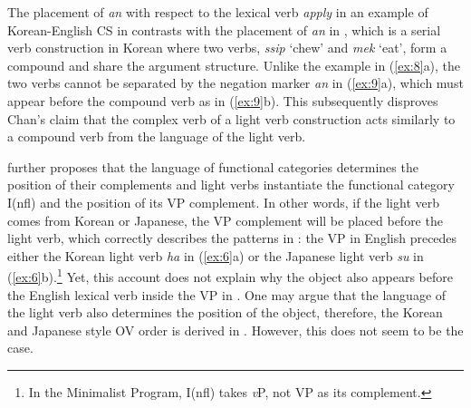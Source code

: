 The placement of \textit{an} with respect to the lexical verb \textit{apply} in an example of Korean-English \ac{CS} in  contrasts with the placement of \textit{an} in , which is a serial verb construction in Korean where two verbs, \textit{ssip} ‘chew’ and \textit{mek} ‘eat’, form a compound and share the argument structure. Unlike the example in (\ref{ex:8}a), the two verbs cannot be separated by the negation marker \textit{an} in (\ref{ex:9}a), which must appear before the compound verb as in (\ref{ex:9}b). This subsequently disproves Chan's claim that the complex verb of a light verb construction acts similarly to a compound verb from the language of the light verb. 

\begin{exe}\ex \label{ex:9}
    \begin{xlist}
    \end{xlist}
\end{exe}

\citet{Chan2008} further proposes that the language of functional categories determines the position of their complements and light verbs instantiate the functional category \acs{I(nfl)} and the position of its \ac{VP} complement. In other words, if the light verb comes from Korean or Japanese, the \ac{VP} complement will be placed before the light verb, which correctly describes the patterns in : the \ac{VP} in English precedes either the Korean light verb \textit{ha} in (\ref{ex:6}a) or the Japanese light verb \textit{su} in (\ref{ex:6}b).\footnote{In the Minimalist Program, I(nfl) takes \textit{v}P, not \ac{VP} as its complement.} Yet, this account does not explain why the object also appears before the English lexical verb inside the \ac{VP} in . One may argue that the language of the light verb also determines the position of the object, therefore, the Korean and Japanese style \ac{OV} order is derived in . However, this does not seem to be the case. 

